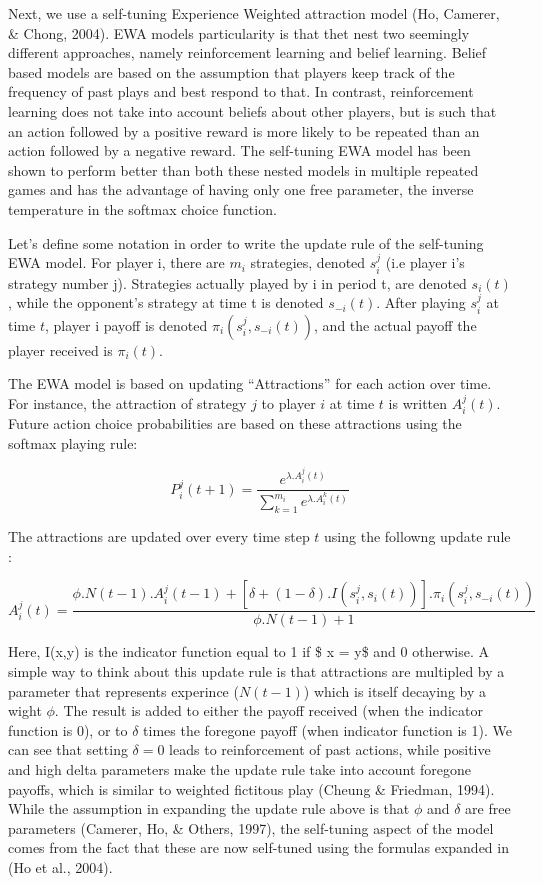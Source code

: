 \documentclass[man,floatsintext]{apa6}
\begin{document}
Next, we use a self-tuning Experience Weighted attraction model (Ho, Camerer, \& Chong, 2004). EWA models particularity is that thet nest two seemingly different approaches, namely reinforcement learning and belief learning. Belief based models are based on the assumption that players keep track of the frequency of past plays and best respond to that. In contrast, reinforcement learning does not take into account beliefs about other players, but is such that an action followed by a positive reward is more likely to be repeated than an action followed by a negative reward. The self-tuning EWA model has been shown to perform better than both these nested models in multiple repeated games and has the advantage of having only one free parameter, the inverse temperature in the softmax choice function.

Let's define some notation in order to write the update rule of the self-tuning EWA model. For player i, there are \(m_{i}\) strategies, denoted \(s_{i}^{j}\) (i.e player i's strategy number j). Strategies actually played by i in period t, are denoted \(s_{i}(t)\), while the opponent's strategy at time t is denoted \(s_{-i}(t)\). After playing \(s_{i}^{j}\) at time \(t\), player i payoff is denoted \(\pi_{i}(s_{i}^{j},s_{-i}(t))\), and the actual payoff the player received is \(\pi_{i}(t)\).

The EWA model is based on updating ``Attractions'' for each action over time. For instance, the attraction of strategy \(j\) to player \(i\) at time \(t\) is written \(A_{i}^{j}(t)\). Future action choice probabilities are based on these attractions using the softmax playing rule:

\[P_{i}^{j}(t+1) = \frac{e^{\lambda . A_{i}^{j}(t)}}{\sum_{k=1}^{m_{i}}e^{\lambda . A_{i}^{k}(t)}} \]

The attractions are updated over every time step \(t\) using the followng update rule :

\[ A_{i}^{j}(t) =  \frac{\phi . N(t-1) . A_{i}^{j}(t-1) + [ \delta + (1-\delta) . I(s_{i}^{j},s_{i}(t))] . \pi_{i}(s_{i}^{j},s_{-i}(t)) } {\phi . N(t-1) + 1} \]

Here, I(x,y) is the indicator function equal to 1 if \$ x = y\$ and 0 otherwise. A simple way to think about this update rule is that attractions are multipled by a parameter that represents experince (\(N(t-1)\)) which is itself decaying by a wight \(\phi\). The result is added to either the payoff received (when the indicator function is 0), or to \(\delta\) times the foregone payoff (when indicator function is 1). We can see that setting \(\delta = 0\) leads to reinforcement of past actions, while positive and high delta parameters make the update rule take into account foregone payoffs, which is similar to weighted fictitous play (Cheung \& Friedman, 1994).
While the assumption in expanding the update rule above is that \(\phi\) and \(\delta\) are free parameters (Camerer, Ho, \& Others, 1997), the self-tuning aspect of the model comes from the fact that these are now self-tuned using the formulas expanded in (Ho et al., 2004).
\end{document}
